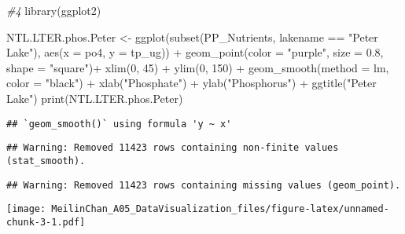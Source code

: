 \documentclass[
]{article}
\newenvironment{Shaded}{\begin{snugshade}}{\end{snugshade}}
\newcommand{\AttributeTok}[1]{\textcolor[rgb]{0.77,0.63,0.00}{#1}}
\newcommand{\CommentTok}[1]{\textcolor[rgb]{0.56,0.35,0.01}{\textit{#1}}}
\newcommand{\DecValTok}[1]{\textcolor[rgb]{0.00,0.00,0.81}{#1}}
\newcommand{\FloatTok}[1]{\textcolor[rgb]{0.00,0.00,0.81}{#1}}
\newcommand{\FunctionTok}[1]{\textcolor[rgb]{0.00,0.00,0.00}{#1}}
\newcommand{\NormalTok}[1]{#1}
\newcommand{\OtherTok}[1]{\textcolor[rgb]{0.56,0.35,0.01}{#1}}
\newcommand{\SpecialCharTok}[1]{\textcolor[rgb]{0.00,0.00,0.00}{#1}}
\newcommand{\StringTok}[1]{\textcolor[rgb]{0.31,0.60,0.02}{#1}}
\begin{document}
\begin{Shaded}
\begin{Highlighting}[]
\CommentTok{\#4}
\FunctionTok{library}\NormalTok{(ggplot2)}

\NormalTok{NTL.LTER.phos.Peter }\OtherTok{\textless{}{-}} \FunctionTok{ggplot}\NormalTok{(}\FunctionTok{subset}\NormalTok{(PP\_Nutrients, lakename }\SpecialCharTok{==} \StringTok{"Peter Lake"}\NormalTok{), }\FunctionTok{aes}\NormalTok{(}\AttributeTok{x =}\NormalTok{ po4, }\AttributeTok{y =}\NormalTok{ tp\_ug)) }\SpecialCharTok{+}
  \FunctionTok{geom\_point}\NormalTok{(}\AttributeTok{color =} \StringTok{"purple"}\NormalTok{, }\AttributeTok{size =} \FloatTok{0.8}\NormalTok{, }\AttributeTok{shape =} \StringTok{"square"}\NormalTok{)}\SpecialCharTok{+}
  \FunctionTok{xlim}\NormalTok{(}\DecValTok{0}\NormalTok{, }\DecValTok{45}\NormalTok{) }\SpecialCharTok{+}
  \FunctionTok{ylim}\NormalTok{(}\DecValTok{0}\NormalTok{, }\DecValTok{150}\NormalTok{) }\SpecialCharTok{+}
  \FunctionTok{geom\_smooth}\NormalTok{(}\AttributeTok{method =}\NormalTok{ lm, }\AttributeTok{color =} \StringTok{"black"}\NormalTok{) }\SpecialCharTok{+}
  \FunctionTok{xlab}\NormalTok{(}\StringTok{"Phosphate"}\NormalTok{) }\SpecialCharTok{+}
  \FunctionTok{ylab}\NormalTok{(}\StringTok{"Phosphorus"}\NormalTok{) }\SpecialCharTok{+}
  \FunctionTok{ggtitle}\NormalTok{(}\StringTok{"Peter Lake"}\NormalTok{)}
\FunctionTok{print}\NormalTok{(NTL.LTER.phos.Peter)}
\end{Highlighting}
\end{Shaded}

\begin{verbatim}
## `geom_smooth()` using formula 'y ~ x'
\end{verbatim}

\begin{verbatim}
## Warning: Removed 11423 rows containing non-finite values (stat_smooth).
\end{verbatim}

\begin{verbatim}
## Warning: Removed 11423 rows containing missing values (geom_point).
\end{verbatim}

\texttt{[image: MeilinChan\_A05\_DataVisualization\_files/figure-latex/unnamed-chunk-3-1.pdf]}
\end{document}
